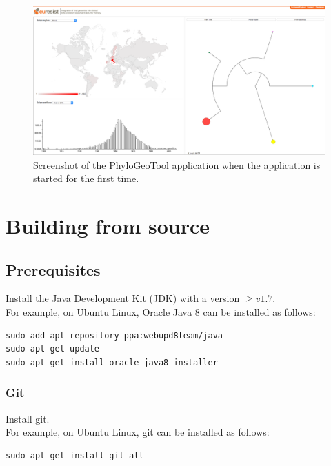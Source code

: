\documentclass[a4paper, 11pt]{article} %
\begin{document}
\begin{figure}[!htbp]
\includegraphics[scale=0.19]{images/defaultScreenshot.png}
\caption{Screenshot of the PhyloGeoTool application when the application is started for the first time.}
\label{fig:01} 
\end{figure}


\section{Building from source}
\label{sec:source}

\subsection{Prerequisites}
Install the Java Development Kit (JDK) with a version $\geq v 1.7$.\\

\noindent For example, on Ubuntu Linux, Oracle Java 8 can be installed as follows:
\begin{verbatim} 
sudo add-apt-repository ppa:webupd8team/java
sudo apt-get update
sudo apt-get install oracle-java8-installer
\end{verbatim}

\subsubsection*{Git}
Install git.\\

\noindent For example, on Ubuntu Linux, git can be installed as follows:
\begin{verbatim}
sudo apt-get install git-all
\end{verbatim}
\end{document}
